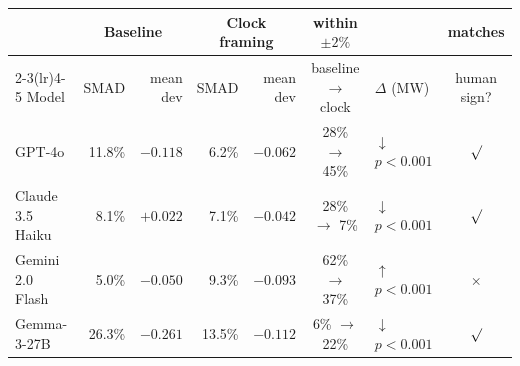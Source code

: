 \begin{tabular}{l rr rr c l c}
\toprule
 & \multicolumn{2}{c}{Baseline} & \multicolumn{2}{c}{Clock framing} & within $\pm2\%$ & & matches \\
\cmidrule(lr){2-3}\cmidrule(lr){4-5}
Model & SMAD & mean dev & SMAD & mean dev & baseline $\to$ clock & $\Delta$ (MW) & human sign? \\
\midrule
GPT-4o & 11.8\% & $-0.118$ & 6.2\% & $-0.062$ & 28\% $\to$ 45\% & $\downarrow$ {\scriptsize $p<0.001$} & $\surd$ \\
Claude 3.5 Haiku & 8.1\% & $+0.022$ & 7.1\% & $-0.042$ & 28\% $\to$ 7\% & $\downarrow$ {\scriptsize $p<0.001$} & $\surd$ \\
Gemini 2.0 Flash & 5.0\% & $-0.050$ & 9.3\% & $-0.093$ & 62\% $\to$ 37\% & $\uparrow$ {\scriptsize $p<0.001$} & $\times$ \\
Gemma-3-27B & 26.3\% & $-0.261$ & 13.5\% & $-0.112$ & 6\% $\to$ 22\% & $\downarrow$ {\scriptsize $p<0.001$} & $\surd$ \\
\bottomrule
\end{tabular}

